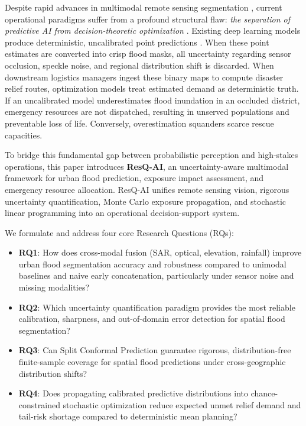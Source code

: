 \documentclass[journal]{IEEEtran}
\begin{document}
Despite rapid advances in multimodal remote sensing segmentation \cite{hong2021, schmitt2019, ienco2019}, current operational paradigms suffer from a profound structural flaw: \textit{the separation of predictive AI from decision-theoretic optimization} \cite{elmachtoub2022, mandi2020, wilder2019}. Existing deep learning models produce deterministic, uncalibrated point predictions \cite{ovadia2019, gawlikowski2023}. When these point estimates are converted into crisp flood masks, all uncertainty regarding sensor occlusion, speckle noise, and regional distribution shift is discarded. When downstream logistics managers ingest these binary maps to compute disaster relief routes, optimization models treat estimated demand as deterministic truth. If an uncalibrated model underestimates flood inundation in an occluded district, emergency resources are not dispatched, resulting in unserved populations and preventable loss of life. Conversely, overestimation squanders scarce rescue capacities.

To bridge this fundamental gap between probabilistic perception and high-stakes operations, this paper introduces \textbf{ResQ-AI}, an uncertainty-aware multimodal framework for urban flood prediction, exposure impact assessment, and emergency resource allocation. ResQ-AI unifies remote sensing vision, rigorous uncertainty quantification, Monte Carlo exposure propagation, and stochastic linear programming into an operational decision-support system.

We formulate and address four core Research Questions (RQs):
\begin{itemize}
    \item \textbf{RQ1}: How does cross-modal fusion (SAR, optical, elevation, rainfall) improve urban flood segmentation accuracy and robustness compared to unimodal baselines and naive early concatenation, particularly under sensor noise and missing modalities?
    \item \textbf{RQ2}: Which uncertainty quantification paradigm provides the most reliable calibration, sharpness, and out-of-domain error detection for spatial flood segmentation?
    \item \textbf{RQ3}: Can Split Conformal Prediction guarantee rigorous, distribution-free finite-sample coverage for spatial flood predictions under cross-geographic distribution shifts?
    \item \textbf{RQ4}: Does propagating calibrated predictive distributions into chance-constrained stochastic optimization reduce expected unmet relief demand and tail-risk shortage compared to deterministic mean planning?
\end{itemize}
\end{document}

